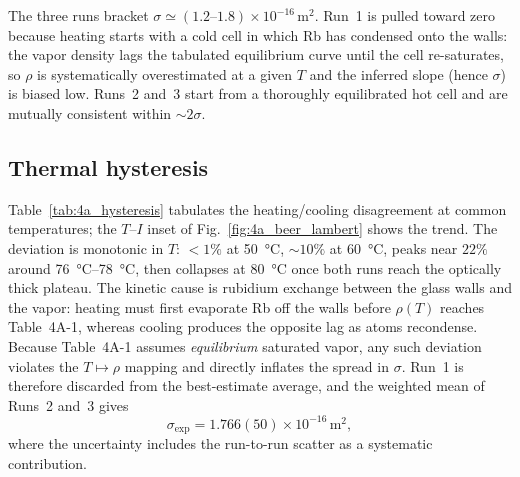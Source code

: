 The three runs bracket $\sigma \simeq (1.2\text{--}1.8)\times 10^{-16}\,\si{\meter\squared}$.
Run~1 is pulled toward zero because heating starts with a cold cell in
which Rb has condensed onto the walls: the vapor density lags the
tabulated equilibrium curve until the cell re-saturates, so $\rho$ is
systematically overestimated at a given $T$ and the inferred slope (hence
$\sigma$) is biased low. Runs~2 and~3 start from a thoroughly equilibrated
hot cell and are mutually consistent within ${\sim}2\sigma$.

\subsection{Thermal hysteresis}
Table~\ref{tab:4a_hysteresis} tabulates the heating/cooling disagreement at
common temperatures; the $T$--$I$ inset of Fig.~\ref{fig:4a_beer_lambert}
shows the trend. The deviation is monotonic in $T$: $<1\%$ at
\SI{50}{\celsius}, $\sim 10\%$ at \SI{60}{\celsius}, peaks near $22\%$
around \SIrange{76}{78}{\celsius}, then collapses at \SI{80}{\celsius} once
both runs reach the optically thick plateau. The kinetic cause is rubidium exchange between the glass walls and
the vapor: heating must first evaporate Rb off the walls before $\rho(T)$
reaches Table~4A-1, whereas cooling produces the opposite lag as atoms
recondense. Because Table~4A-1 assumes \emph{equilibrium} saturated vapor,
any such deviation violates the $T \mapsto \rho$ mapping and directly
inflates the spread in $\sigma$. Run~1 is therefore discarded from the
best-estimate average, and the weighted mean of Runs~2 and~3 gives
\begin{equation}
  \sigma_{\mathrm{exp}} = 1.766(50)\times 10^{-16}\,\si{\meter\squared},
  \label{eq:sigma_best}
\end{equation}
where the uncertainty includes the run-to-run scatter as a systematic
contribution.

